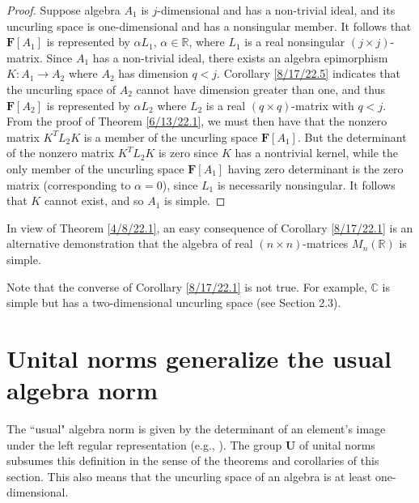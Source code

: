 \documentclass{amsart}
\numberwithin{equation}{section}
\theoremstyle{definition}
\numberwithin{theorem}{section}
\begin{document}
\begin{proof} Suppose algebra $A_1$ is $j$-dimensional and has a non-trivial ideal, and its uncurling space is one-dimensional and has a nonsingular member.  It follows that $\mathbf{F}[A_1]$ is represented by  $\alpha L_1$, $\alpha\in \mathbb{R}$, where $L_1$ is a real nonsingular $(j\times j)$-matrix.  Since $A_1$ has a non-trivial ideal, there exists an algebra epimorphism $K:A_1\rightarrow A_2$ where $A_2$ has dimension $q<j$.  Corollary \ref{8/17/22.5} indicates that the uncurling space of $A_2$ cannot have dimension greater than one, and thus $\mathbf{F}[A_2]$ is represented by $\alpha L_2$ where $L_2$ is a real $(q\times q)$-matrix with $q<j$. From the proof of Theorem \ref{6/13/22.1}, we must then have that the nonzero matrix $ K^T L_2 K$ is a member of the uncurling space $\mathbf{F}[A_1]$.  But the determinant of the nonzero matrix $ K^T L_2 K$ is zero since $K$ has a nontrivial kernel, while the only member of the uncurling space $\mathbf{F}[A_1]$ having zero determinant is the zero matrix (corresponding to $\alpha=0$), since $L_1$ is necessarily nonsingular.   It follows that $K$ cannot exist, and so $A_1$ is simple. \end{proof}


In view of Theorem \ref{4/8/22.1}, an easy consequence of Corollary \ref{8/17/22.1} is an alternative demonstration that the algebra of real $(n\times n)$-matrices $ M_n(\mathbb{R})$ is simple.  

Note that the converse of Corollary \ref{8/17/22.1} is not true.  For example, $\mathbb{C}$ is simple but has a two-dimensional uncurling space (see Section 2.3).


\section{Unital norms generalize the usual algebra norm} 

The ``usual" algebra norm is given by the determinant of an element's image under the left regular representation (e.g., \cite{bourbaki:1989}).  The group $\mathbf{U}$ of unital norms subsumes this definition in the sense of the theorems and corollaries of this section.  This also means that the uncurling space of an algebra is at least one-dimensional.
\end{document}
